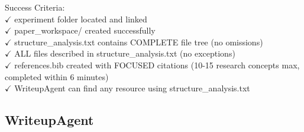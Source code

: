\documentclass{article}
\begin{document}
\begin{tcolorbox}[colback=yellow!5,colframe=yellow!50,title=ResourcePreparationAgent System Prompt,breakable]
Success Criteria:\\
$\checkmark$ experiment folder located and linked\\
$\checkmark$ paper\_workspace/ created successfully\\
$\checkmark$ structure\_analysis.txt contains COMPLETE file tree (no omissions)\\
$\checkmark$ ALL files described in structure\_analysis.txt (no exceptions)\\
$\checkmark$ references.bib created with FOCUSED citations (10-15 research concepts max, completed within 6 minutes)\\
$\checkmark$ WriteupAgent can find any resource using structure\_analysis.txt
\end{tcolorbox}

\subsection{WriteupAgent}
\label{subsec:writeup_prompt}
\end{document}
